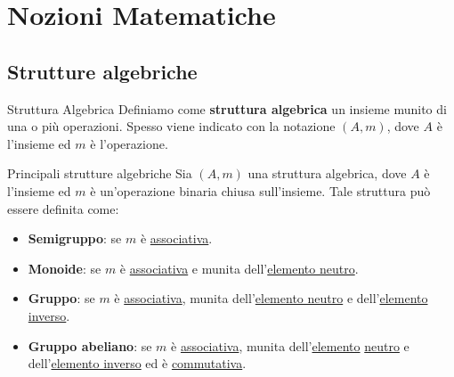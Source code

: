 
\section{Nozioni Matematiche}
\subsection{Strutture algebriche}
\begin{definition}{Struttura Algebrica}{}
    Definiamo come \textbf{struttura algebrica} un insieme munito di una o più operazioni. Spesso viene indicato con la notazione $(A, m)$, dove $A$ è l'insieme ed $m$ è l'operazione.
\end{definition}

\begin{definition}{Principali strutture algebriche}{}
    Sia $(A,m)$ una struttura algebrica, dove $A$ è l'insieme ed $m$ è un'operazione binaria chiusa sull'insieme. 
    Tale struttura può essere definita come:
    \begin{itemize}
        \item \textbf{Semigruppo}: se $m$ è \underline{associativa}.
        \item \textbf{Monoide}: se $m$ è \underline{associativa} e munita dell'\underline{elemento neutro}.
        \item \textbf{Gruppo}: se $m$ è \underline{associativa}, munita dell'\underline{elemento neutro} e dell'\underline{elemento inverso}.
        \item \textbf{Gruppo abeliano}: se $m$ è \underline{associativa}, munita dell'\underline{elemento} \underline{neutro} e dell'\underline{elemento inverso} ed è \underline{commutativa}.
    \end{itemize}
\end{definition}

